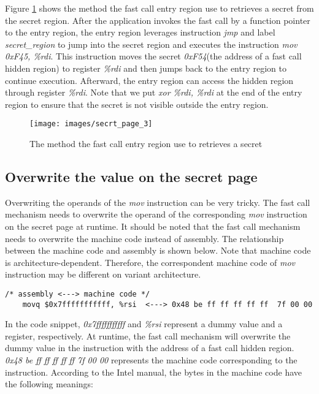   Figure \ref{fig:secrt_page_3}  shows the method the fast call entry region use to retrieves a 
  secret from the secret region. After the application invokes the 
  fast call by a function pointer to the entry region, the entry region 
  leverages instruction \emph{jmp} and label \emph{secret\_region} to jump into the 
  secret region and executes the instruction \emph{mov 0xF45, \%rdi}. This 
  instruction moves the secret \emph{0xF54}(the address of a fast call hidden region) 
  to register \emph{\%rdi} and then jumps back to the entry region to continue execution. 
  Afterward, the entry region can access the hidden region through register \emph{\%rdi}.
  Note that we put  \emph{xor \%rdi, \%rdi} at the end of the entry region to ensure that the secret is not visible outside the entry region. 

  \begin{figure}[H]
    \centering
    \texttt{[image: images/secrt\_page\_3]}
    \caption[Short description]{The method the fast call entry region use to retrieves a 
    secret}
     \label{fig:secrt_page_3}
  \end{figure}

  \subsection{Overwrite the value on the secret page}

  Overwriting the operands of the \emph{mov} instruction can be very tricky. 
  The fast call mechanism needs to overwrite the operand of the corresponding 
  \emph{mov} instruction on the secret page at runtime. It should be noted that 
  the fast call mechanism needs to overwrite the machine code instead of 
  assembly. The relationship between the machine code and assembly is 
  shown below. Note that machine code is architecture-dependent. Therefore, the correspondent 
  machine code of \emph{mov} instruction may be different on variant architecture.
   

  \begin{lstlisting}[style=CStyle]
    /* assembly <---> machine code */
    movq $0x7fffffffffff, %rsi  <---> 0x48 be ff ff ff ff ff  7f 00 00
  \end{lstlisting}

  In the code snippet, \emph{0x7fffffffffff} and \emph{\%rsi} represent a dummy 
  value and a register, respectively. At runtime, the fast call mechanism 
  will overwrite the dummy value in the instruction with the address of a 
  fast call hidden region. \emph{0x48 be ff ff ff ff ff  7f 00 00} represents the 
  machine code corresponding to the instruction. According to the Intel manual, 
  the bytes in the machine code have the following meanings\cite{14}:
  
